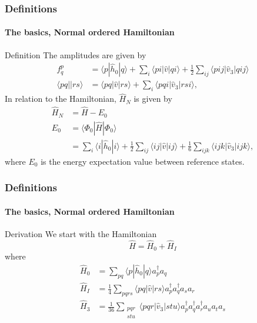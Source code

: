 \documentclass[compress]{beamer}
\newcommand*{\ket}[1]{|#1\rangle}
\newcommand*{\bra}[1]{\langle#1|}
\newcommand{\element}[3]
        {\bra{#1}#2\ket{#3}}
\begin{document}
\begin{frame}[fragile]
    \frametitle{Definitions}
    \framesubtitle{The basics, Normal ordered Hamiltonian}

    \small
    \begin{block}{Definition}
    The amplitudes are given by
    \begin{subequations}
    \begin{align*}
        f_q^p &= \element{p}{\hat{h}_0}{q} + \sum_i \element{pi}{\hat{v}}{qi} 
            + \frac{1}{2} \sum_{ij} \element{pij}{\hat{v}_3}{qij} \\
        \bra{pq}\ket{rs} &= \element{pq}{\hat{v}}{rs} + \sum_i \element{pqi}{\hat{v}_3}{rsi},
    \end{align*}
    \end{subequations}
    In relation to the Hamiltonian, $\hat{H}_N$ is given by
    \begin{align*}
        \hat{H}_N &= \hat{H} - E_0 \\
        E_0 &= \element{\Phi_0}{\hat{H}}{\Phi_0} \\
            &= \sum_i \element{i}{\hat{h}_0}{i}
                + \frac{1}{2} \sum_{ij} \element{ij}{\hat{v}}{ij}
                + \frac{1}{6} \sum_{ijk} \element{ijk}{\hat{v}_3}{ijk},
    \end{align*}
    where $E_0$ is the energy expectation value between reference states.
    \end{block}


\end{frame}

\begin{frame}[fragile]
    \frametitle{Definitions}
    \framesubtitle{The basics, Normal ordered Hamiltonian}

    \small
    \begin{block}{Derivation}
    We start with the Hamiltonian
    \begin{equation*}
        \hat{H} = \hat{H}_0 + \hat{H}_I
    \end{equation*}
    where
    \begin{subequations}
        \begin{align*}
        \hat{H}_0 &= \sum_{pq} \element{p}{\hat{h}_0}{q} a^\dagger_p a_q \\
        \hat{H}_I &= \frac{1}{4} \sum_{pqrs} \element{pq}{\hat{v}}{rs} a^\dagger_p a^\dagger_q a_s  a_r \\
        \hat{H}_3 &= \frac{1}{36} \sum_{\substack{
                            pqr \\
                            stu}}
                     \element{pqr}{\hat{v}_3}{stu} a^\dagger_p a^\dagger_q a^\dagger_r a_u a_t a_s
        \end{align*}
    \end{subequations}

    \end{block}

\end{frame}
\end{document}
